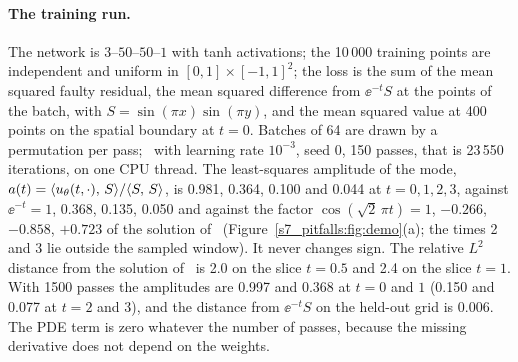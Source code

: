 \paragraph{The training run.} The network is $3$--$50$--$50$--$1$ with tanh activations; the
10\,000 training points are independent and uniform in $[0,1]\times[-1,1]^2$; the loss is the sum
of the mean squared faulty residual, the mean squared difference from $\ee^{-t}S$ at the points of
the batch, with $S=\sin(\pi x)\sin(\pi y)$, and the mean squared value at 400 points on the spatial
boundary at $t=0$. Batches of 64 are drawn by a permutation per pass; \Adam\ with learning rate
$10^{-3}$, seed 0, 150 passes, that is 23\,550 iterations, on one CPU thread.
The least-squares amplitude of the mode, $a(t)=\langle u_{\theta}(t,\cdot),\,S\rangle/\langle S,\,S\rangle$, is 0.981, 0.364,
0.100 and 0.044 at $t=0,1,2,3$, against $\ee^{-t}=1$, 0.368, 0.135, 0.050 and against the factor
$\cos(\sqrt2\,\pi t)=1$, $-0.266$, $-0.858$, $+0.723$ of the solution of \PWtwo\
(Figure~\ref{s7_pitfalls:fig:demo}(a); the times 2 and 3 lie outside the sampled window). It never
changes sign. The relative $L^2$ distance from the solution of \PWtwo\ is 2.0 on the slice $t=0.5$
and 2.4 on the slice $t=1$.
With 1500 passes the amplitudes are 0.997 and 0.368 at $t=0$ and $1$ (0.150 and 0.077 at $t=2$
and $3$), and the distance from $\ee^{-t}S$ on the held-out grid is 0.006. The PDE term is zero
whatever the number of passes, because the missing derivative does not depend on the weights.

